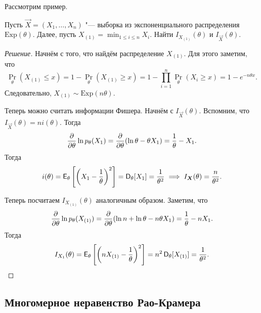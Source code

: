 Рассмотрим пример.
\begin{problem}
	Пусть $\vec{X} = (X_{1}, \ldots, X_{n})$ "--- выборка из экспоненциального распределения $\mathrm{Exp}(\theta)$. Далее, пусть $X_{(1)} = \min_{1 \leq i \leq n} X_{i}$. Найти $I_{X_{(1)}}(\theta)$ и $I_{\vec{X}}(\theta)$.
\end{problem}
\begin{proof}[Решение]
	Начнём с того, что найдём распределение $X_{(1)}$. Для этого заметим, что
	\[
		\Pr_{\theta}(X_{(1)} \leq x) = 1 - \Pr_{\theta}(X_{(1)} \geq x) = 1 - \prod_{i = 1}^{n} \Pr_{\theta}(X_{i} \geq x) = 1 - e^{-n\theta x}.
	\]
	Следовательно, $X_{(1)} \sim \mathrm{Exp}(n\theta)$. 
	
	Теперь можно считать информации Фишера. Начнём с $I_{\vec{X}}(\theta)$. Вспомним, что $I_{\vec{X}}(\theta) = ni(\theta)$. Тогда
	\[
		\pdv{\theta} \ln p_{\theta}(X_{1}) = \pdv{\theta}(\ln \theta - \theta X_{1}) = \frac{1}{\theta} - X_{1}.
	\]
	Тогда
	\[
		i(\theta) = \operatorname{\mathsf{E}}_{\theta}\left[\left(X_{1} - \frac{1}{\theta}\right)^{2}\right] = \operatorname{\mathsf{D}}_{\theta}[X_{1}] = \frac{1}{\theta^{2}} \implies I_{\bm{X}}(\theta) = \frac{n}{\theta^{2}}.
	\]
	
	Теперь посчитаем $I_{X_{(1)}}(\theta)$ аналогичным образом. Заметим, что
	\[
		\pdv{\theta} \ln p_{\theta}(X_{(1)}) = \pdv{\theta}(\ln n + \ln \theta - n\theta X_{1}) = \frac{1}{\theta} - nX_{1}.
	\]
	Тогда 
	\[
		I_{X_{1}}(\theta) = \operatorname{\mathsf{E}}_{\theta}\left[\left(nX_{(1)} - \frac{1}{\theta}\right)^{2}\right] = n^{2}\operatorname{\mathsf{D}}_{\theta}[X_{(1)}] = \frac{1}{\theta^{2}}. \qedhere
	\]
\end{proof}

\subsection{Многомерное неравенство Рао-Крамера}

